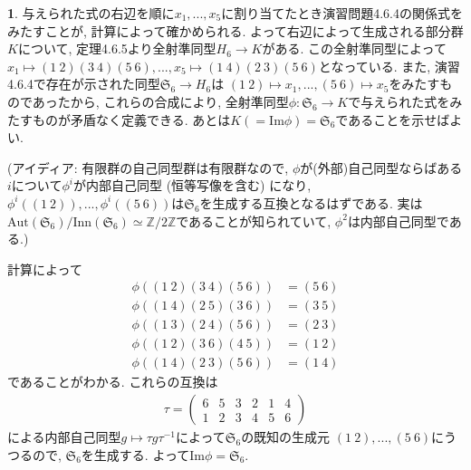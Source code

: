 \documentclass{article}
\theoremstyle{definition}
\newtheorem{ans}{}
\numberwithin{ans}{subsection}
\newcommand{\Z}[1]{\mathbb{Z}/#1\mathbb{Z}}
\begin{document}
\begin{ans}
  与えられた式の右辺を順に$x_1,..., x_5$に割り当てたとき演習問題4.6.4の関係式をみたすことが, 計算によって確かめられる.
  よって右辺によって生成される部分群$K$について, 定理4.6.5より全射準同型$H_6 \rightarrow K$がある.
  この全射準同型によって$x_1 \mapsto (1\ 2)(3\ 4)(5\ 6),..., x_5 \mapsto (1\ 4)(2\ 3)(5\ 6)$となっている.
  また, 演習4.6.4で存在が示された同型$\mathfrak{S}_6 \rightarrow H_6$は
  $(1\ 2) \mapsto x_1,..., (5\ 6) \mapsto x_5$をみたすものであったから,
  これらの合成により, 全射準同型$\phi: \mathfrak{S}_6 \rightarrow K$で与えられた式をみたすものが矛盾なく定義できる.
  あとは$K (= \mathrm{Im}\phi) = \mathfrak{S}_6$であることを示せばよい.

  (アイディア: 有限群の自己同型群は有限群なので, $\phi$が(外部)自己同型ならばある$i$について$\phi^i$が内部自己同型 (恒等写像を含む) になり,
  $\phi^i((1\ 2)),..., \phi^i((5\ 6))$は$\mathfrak{S}_6$を生成する互換となるはずである.
  実は$\mathrm{Aut}(\mathfrak{S}_6)/\mathrm{Inn}(\mathfrak{S}_6) \simeq \Z{2}$であることが知られていて,
  $\phi^2$は内部自己同型である.)

  計算によって
  \begin{align*}
    \phi((1\ 2)(3\ 4)(5\ 6)) &= (5\ 6) \\
    \phi((1\ 4)(2\ 5)(3\ 6)) &= (3\ 5) \\
    \phi((1\ 3)(2\ 4)(5\ 6)) &= (2\ 3) \\
    \phi((1\ 2)(3\ 6)(4\ 5)) &= (1\ 2) \\
    \phi((1\ 4)(2\ 3)(5\ 6)) &= (1\ 4)
  \end{align*}
  であることがわかる. これらの互換は
  \begin{align*}
    \tau = \begin{pmatrix}
      6 & 5 & 3 & 2 & 1 & 4 \\
      1 & 2 & 3 & 4 & 5 & 6
    \end{pmatrix}
  \end{align*}
  による内部自己同型$g \mapsto \tau g \tau^{-1}$によって$\mathfrak{S}_6$の既知の生成元
  $(1\ 2),..., (5\ 6)$にうつるので, $\mathfrak{S}_6$を生成する.
  よって$\mathrm{Im}\phi = \mathfrak{S}_6$.
\end{ans}
\end{document}
